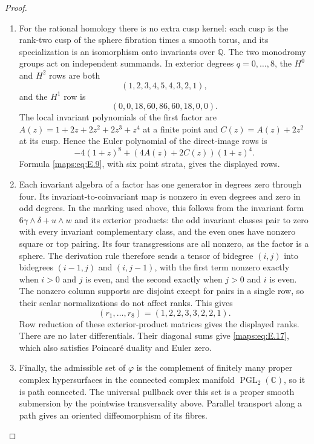 \begin{proof}
\begin{enumerate}[label=\arabic*.,leftmargin=*]
\item For the rational homology there is no extra cusp kernel: each
cusp is the rank-two cusp of the sphere fibration times a smooth torus, and its
specialization is an isomorphism onto invariants over $\mathbb Q$.
The two monodromy groups act on independent summands.  In exterior
degrees $q=0,\ldots,8$, the $H^0$ and $H^2$ rows are both
\[
 (1,2,3,4,5,4,3,2,1),
\]
and the $H^1$ row is
\[
 (0,0,18,60,86,60,18,0,0).
\]
The local invariant polynomials of the first factor are
$A(z)=1+2z+2z^2+2z^3+z^4$ at a finite point and
$C(z)=A(z)+2z^2$ at its cusp.  Hence the Euler polynomial of
the direct-image rows is
\[
 -4(1+z)^8+(4A(z)+2C(z))(1+z)^4.
\]
Formula \eqref{maps:eq:E.9}, with six point strata, gives the displayed rows.

\item Each invariant algebra of a factor has one generator in degrees
zero through four.  Its invariant-to-coinvariant map is nonzero
in even degrees and zero in odd degrees.  In the marking used
above, this follows from the invariant form
$6\gamma\wedge\delta+u\wedge w$ and its exterior products:
the odd invariant classes pair to zero with every invariant
complementary class, and the even ones have nonzero square or
top pairing.  Its four transgressions are all nonzero, as the
factor is a sphere.  The derivation rule therefore sends a tensor
of bidegree $(i,j)$ into bidegrees $(i-1,j)$ and $(i,j-1)$,
with the first term nonzero exactly when $i>0$ and $j$ is even,
and the second exactly when $j>0$ and $i$ is even.  The nonzero
column supports are disjoint except for pairs in a single row,
so their scalar normalizations do not affect ranks.  This gives
\[
 (r_1,\ldots,r_8)=(1,2,2,3,3,2,2,1).
\]
Row reduction of these exterior-product matrices gives the displayed ranks.
There are no later differentials.  Their diagonal sums give
\eqref{maps:eq:E.17}, which also satisfies Poincar\'e duality and Euler zero.

\item Finally, the admissible set of $\varphi$ is the complement of
finitely many proper complex hypersurfaces in the connected
complex manifold $\operatorname{PGL}_2(\mathbb C)$, so it is
path connected.  The universal pullback over this set is a
proper smooth submersion by the pointwise transversality above.  Parallel transport along a path gives an oriented
diffeomorphism of its fibres.
\end{enumerate}
\end{proof}
